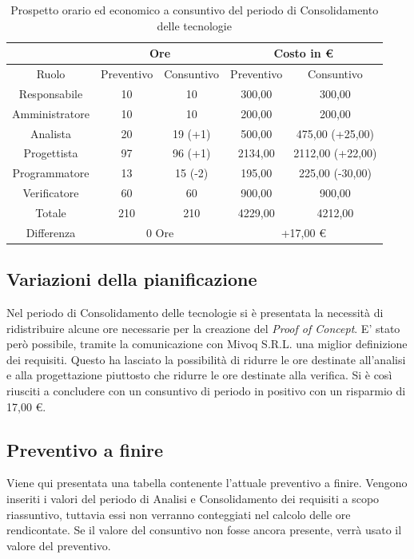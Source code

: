 \documentclass[./PianodiProgetto.tex]{subfiles}
\begin{document}
\begin{table}[H]
	\centering                   
       \begin{tabular}{|c|c|c|c|c|}
		\hline
		& \multicolumn{2}{c|}{Ore} & \multicolumn{2}{c|}{Costo in \euro{}}  \\ \hline
		Ruolo&Preventivo&Consuntivo&Preventivo&Consuntivo \\ \hline
		Responsabile&10&10&300,00&300,00  \\ \hline
		Amministratore&10&10&200,00&200,00 \\ \hline
		Analista&20&19 (+1)&500,00&475,00 (+25,00)  \\ \hline
		Progettista&97&96 (+1)&2134,00&2112,00 (+22,00) \\ \hline
		Programmatore&13&15 (-2)&195,00&225,00 (-30,00)  \\ \hline
		Verificatore&60&60&900,00&900,00  \\ \hline
		Totale&210&210&4229,00&4212,00  \\ \hline
		Differenza& \multicolumn{2}{c|}{0 Ore} & \multicolumn{2}{c|}{+17,00 \euro{}} \\ \hline
	\end{tabular}
	\caption{Prospetto orario ed economico a consuntivo del periodo di Consolidamento delle tecnologie}
\end{table}

\subsection{Variazioni della pianificazione}
Nel periodo di Consolidamento delle tecnologie si è presentata la necessità di ridistribuire alcune ore necessarie per la creazione del \textit{Proof of Concept}. E'
stato però possibile, tramite la comunicazione con Mivoq S.R.L. una miglior definizione dei requisiti. Questo ha lasciato la possibilità di ridurre le ore destinate all'analisi e alla progettazione piuttosto che ridurre le ore destinate alla verifica. Si è così riusciti a concludere con un consuntivo di periodo in positivo con un risparmio di 17,00 \euro{}.

\subsection{Preventivo a finire}
Viene qui presentata una tabella contenente l'attuale preventivo a finire.
Vengono inseriti i valori del periodo di Analisi e Consolidamento dei requisiti a scopo riassuntivo, tuttavia essi non verranno conteggiati nel calcolo delle ore rendicontate. Se il valore del consuntivo non fosse ancora presente, verrà usato il valore del preventivo.
\end{document}
